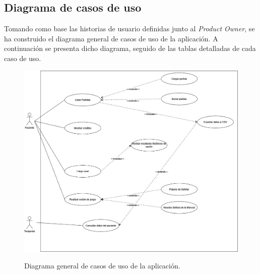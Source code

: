 \subsection{Diagrama de casos de uso}
Tomando como base las historias de usuario definidas junto al \textit{Product Owner}, se ha construido el diagrama general de casos de uso de la aplicación. A continuación se presenta dicho diagrama, seguido de las tablas detalladas de cada caso de uso.
\begin{figure}[h]
	\caption[Diagrama: casos de uso]{Diagrama general de casos de uso de la aplicación.}
	\centering
	\includegraphics[width=\textwidth]{../img/diagramacasodeuso.png}
	\label{b:diagrama-cu}
\end{figure}

